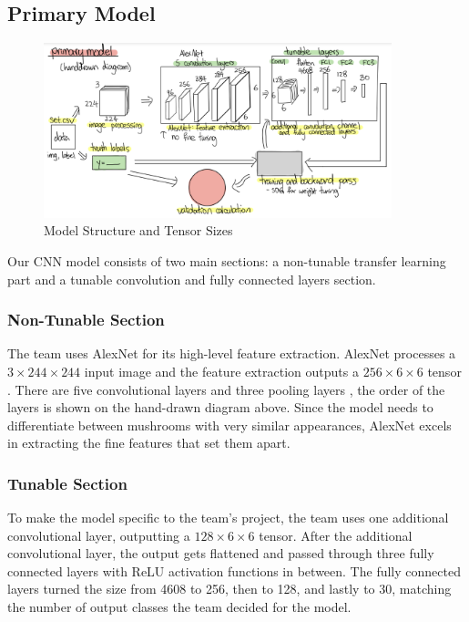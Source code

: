 \documentclass{article} %
\begin{document}
\subsection{Primary Model}
\begin{figure}[h]
    \begin{center}
    \includegraphics[width=0.9\textwidth]{figures/primaryModelDiagram.png}
    \end{center}
    \caption{Model Structure and Tensor Sizes}
\end{figure}


Our CNN model consists of two main sections: a non-tunable transfer learning part and a tunable convolution and fully connected layers section.

\subsubsection{Non-Tunable Section}
  
The team uses AlexNet for its high-level feature extraction. AlexNet processes a $3 \times 244 \times 244$ input image and the feature extraction outputs a $256 \times 6 \times 6$ tensor \citep{Bangar.AlexNetArchitectureExplained.2022}. There are five convolutional layers and three pooling layers \citep{Bangar.AlexNetArchitectureExplained.2022}, the order of the layers is shown on the hand-drawn diagram above. Since the model needs to differentiate between mushrooms with very similar appearances, AlexNet excels in extracting the fine features that set them apart.
  
\subsubsection{Tunable Section}
  
To make the model specific to the team’s project, the team uses one additional convolutional layer, outputting a $128 \times 6 \times 6$ tensor. After the additional convolutional layer, the output gets flattened and passed through three fully connected layers with ReLU activation functions in between. The fully connected layers turned the size from 4608 to 256, then to 128, and lastly to 30, matching the number of output classes the team decided for the model.
  
\end{document}
